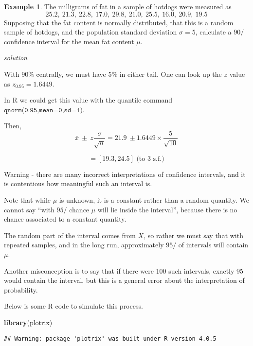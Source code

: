 \documentclass[
]{book}
\newenvironment{Shaded}{\begin{snugshade}}{\end{snugshade}}
\newcommand{\KeywordTok}[1]{\textcolor[rgb]{0.13,0.29,0.53}{\textbf{#1}}}
\newcommand{\NormalTok}[1]{#1}
\theoremstyle{definition}
\theoremstyle{definition}
\newtheorem{example}{Example}[chapter]
\theoremstyle{definition}
\theoremstyle{definition}
\theoremstyle{remark}
\begin{document}
\begin{example}
The milligrams of fat in a sample of hotdogs were measured as
\[25.2, \ 21.3,\ 22.8,\ 17.0,\ 29.8,\ 21.0,\ 25.5,\ 16.0,\ 20.9, \ 19.5\]
Supposing that the fat content is normally distributed, that this is a random sample of hotdogs, and the population standard deviation \(\sigma = 5\), calculate a \(90/%
\) confidence interval for the mean fat content \(\mu\).
\end{example}

\emph{solution}

With \(90\%\) centrally, we must have \(5\%\) in either tail. One can look up the \(z\) value as \(z_{0.95}= 1.6449\).

In R we could get this value with the quantile command \(\texttt{qnorm(0.95,mean=0,sd=1)}\).

Then,
\[\bar{x} \ \pm \ z\frac{\sigma}{\sqrt{n}} = 21.9 \ \pm 1.6449\times\frac{5}{\sqrt{10}}\]

\[=[19.3 , 24.5] \text{   (to 3 s.f.)}\]

Warning - there are many incorrect interpretations of confidence intervals, and it is contentious how meaningful such an interval is.

Note that while \(\mu\) is unknown, it is a constant rather than a random quantity. We cannot say ``with \(95/%
\) chance \(\mu\) will lie inside the interval'', because there is no chance associated to a constant quantity.

The random part of the interval comes from \(\overline{X}\), so rather we must say that with repeated samples, and in the long run, approximately \(95/%
\) of intervals will contain \(\mu\).

Another misconception is to say that if there were 100 such intervals, exactly 95 would contain the interval, but this is a general error about the interpretation of probability.

Below is some R code to simulate this process.

\begin{Shaded}
\begin{Highlighting}[]
\KeywordTok{library}\NormalTok{(plotrix)}
\end{Highlighting}
\end{Shaded}

\begin{verbatim}
## Warning: package 'plotrix' was built under R version 4.0.5
\end{verbatim}
\end{document}
